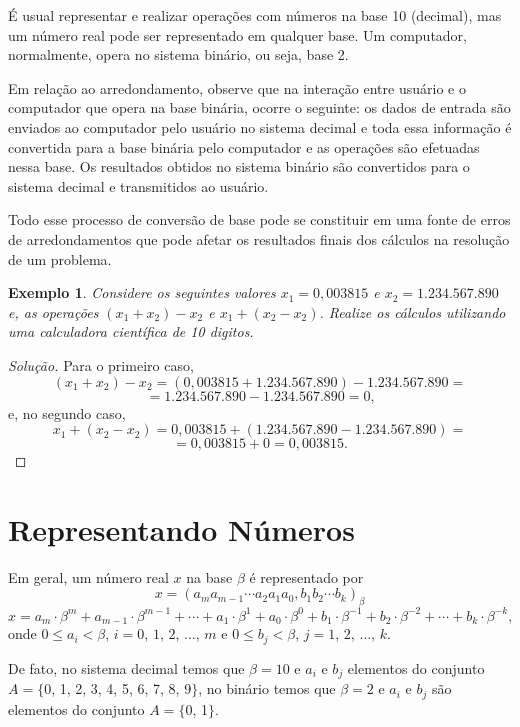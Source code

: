 \documentclass[
	12pt,				%
	openright,			%
	twoside,			%
	a4paper,			%
	english,			%
	french,				%
	brazil,				%
	sumario=tradicional
]{abntex2}
\newtheorem{example}{Exemplo}
\newenvironment{solution}{
	\begin{proof}[Solução]
}{\end{proof}}
\numberwithin{example}{chapter}
\numberwithin{remark}{chapter}
\numberwithin{definition}{chapter}
\numberwithin{figure}{chapter}
\begin{document}
É usual representar e realizar operações com números na base 10 (decimal), mas um número real pode ser representado em qualquer base. Um computador, normalmente, opera no sistema binário, ou seja, base 2.

Em relação ao arredondamento, observe que na interação entre usuário e o computador que opera na base binária, ocorre o seguinte: os dados de entrada são enviados ao computador pelo usuário no sistema decimal e toda essa informação é convertida para a base binária pelo computador e as operações são efetuadas nessa base. Os resultados obtidos no sistema binário são convertidos para o sistema decimal e transmitidos ao usuário.

Todo esse processo de conversão de base pode se constituir em uma fonte de erros de arredondamentos que pode afetar os resultados finais dos cálculos na resolução de um problema.

\begin{example}
	\label{example:x_1_x2_calculadora}
	Considere os seguintes valores $x_1=0,003815$ e $x_2=1.234.567.890$ e, as operações $(x_1+x_2)-x_2$ e $x_1+(x_2-x_2)$. Realize os cálculos utilizando uma calculadora científica de 10 digitos.
\end{example}

\begin{solution}
	Para o primeiro caso,
	$$(x_1+x_2)-x_2=(0,003815+1.234.567.890)-1.234.567.890=$$
	$$=1.234.567.890-1.234.567.890=0\text{,}$$
	e, no segundo caso,
	$$x_1+(x_2-x_2)=0,003815+(1.234.567.890-1.234.567.890)=$$
	$$=0,003815+0=0,003815\text{.}$$
\end{solution}

\chapter{Representando Números}

Em geral, um número real $x$ na base $\beta$ é representado por
$$
	x=(a_{m}a_{m-1}\cdots a_2 a_1 a_0, b_1 b_2\cdots b_k)_{\beta}
$$
$$
	x=a_{m}\cdot \beta^{m}
	+
	a_{m-1} \cdot \beta^{m-1}
	+ \cdots +
	a_1 \cdot \beta^1
	+
	a_0 \cdot \beta^0
	+
	b_1 \cdot \beta^{-1}
	+
	b_2 \cdot \beta^{-2}
	+ \cdots +
	b_k \cdot \beta^{-k}
	\text{,}
$$
onde $0\leqslant a_i < \beta$, $i=0$, $1$, $2$, $\dots$, $m$ e $0\leqslant b_j < \beta$, $j=1$, $2$, $\dots$, $k$.

De fato, no sistema decimal temos que $\beta=10$ e $a_i$ e $b_j$ elementos do conjunto $A=\{$0, 1, 2, 3, 4, 5, 6, 7, 8, 9$\}$, no binário temos que $\beta=2$ e $a_i$ e $b_j$ são elementos do conjunto $A=\{$0, 1$\}$.
\end{document}
